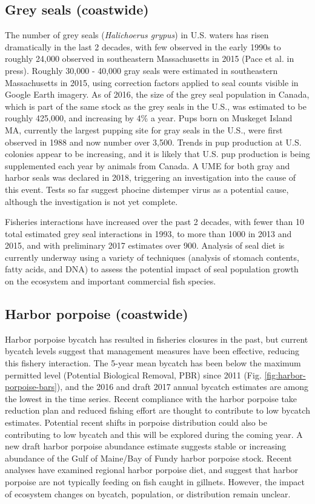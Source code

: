 \documentclass[10pt,]{article}
\begin{document}
\subsection{Grey seals (coastwide)}\label{grey-seals-coastwide}

The number of grey seals (\emph{Halichoerus grypus}) in U.S. waters has
risen dramatically in the last 2 decades, with few observed in the early
1990s to roughly 24,000 observed in southeastern Massachusetts in 2015
(Pace et al. in press). Roughly 30,000 - 40,000 gray seals were
estimated in southeastern Massachusetts in 2015, using correction
factors applied to seal counts visible in Google Earth imagery. As of
2016, the size of the grey seal population in Canada, which is part of
the same stock as the grey seals in the U.S., was estimated to be
roughly 425,000, and increasing by 4\% a year. Pups born on Muskeget
Island MA, currently the largest pupping site for gray seals in the
U.S., were first observed in 1988 and now number over 3,500. Trends in
pup production at U.S. colonies appear to be increasing, and it is
likely that U.S. pup production is being supplemented each year by
animals from Canada. A UME for both gray and harbor seals was declared
in 2018, triggering an investigation into the cause of this event. Tests
so far suggest phocine distemper virus as a potential cause, although
the investigation is not yet complete.

Fisheries interactions have increased over the past 2 decades, with
fewer than 10 total estimated grey seal interactions in 1993, to more
than 1000 in 2013 and 2015, and with preliminary 2017 estimates over
900. Analysis of seal diet is currently underway using a variety of
techniques (analysis of stomach contents, fatty acids, and DNA) to
assess the potential impact of seal population growth on the ecosystem
and important commercial fish species.

\subsection{Harbor porpoise
(coastwide)}\label{harbor-porpoise-coastwide}

Harbor porpoise bycatch has resulted in fisheries closures in the past,
but current bycatch levels suggest that management measures have been
effective, reducing this fishery interaction. The 5-year mean bycatch
has been below the maximum permitted level (Potential Biological
Removal, PBR) since 2011 (Fig. \ref{fig:harbor-porpoise-bars}), and the
2016 and draft 2017 annual bycatch estimates are among the lowest in the
time series. Recent compliance with the harbor porpoise take reduction
plan and reduced fishing effort are thought to contribute to low bycatch
estimates. Potential recent shifts in porpoise distribution could also
be contributing to low bycatch and this will be explored during the
coming year. A new draft harbor porpoise abundance estimate suggests
stable or increasing abundance of the Gulf of Maine/Bay of Fundy harbor
porpoise stock. Recent analyses have examined regional harbor porpoise
diet, and suggest that harbor porpoise are not typically feeding on fish
caught in gillnets. However, the impact of ecosystem changes on bycatch,
population, or distribution remain unclear.
\end{document}
